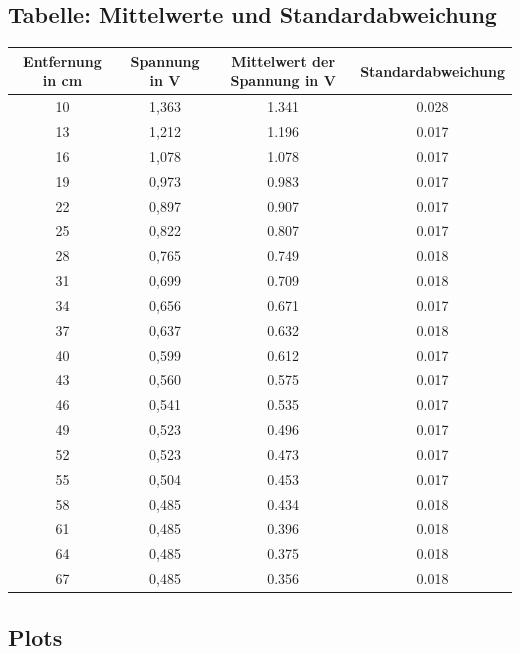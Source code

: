 \subsection{Tabelle: Mittelwerte und Standardabweichung}
\label{chap: Tabllen_Auswertung}
\begin{center}

\begin{tabular}{|c|c|c|c|}
\hline 
Entfernung in cm & Spannung in V & Mittelwert der Spannung in V & Standardabweichung  \\ 
\hline 
10 & 1,363 & 1.341 & 0.028 \\ 
\hline 
13 & 1,212 & 1.196 & 0.017 \\ 
\hline 
16 & 1,078 & 1.078 & 0.017 \\ 
\hline 
19 & 0,973 & 0.983 & 0.017 \\ 

\hline 
22 & 0,897 & 0.907 & 0.017 \\ 
\hline 
25 & 0,822 & 0.807 & 0.017 \\ 
\hline 
28 & 0,765 & 0.749 & 0.018 \\ 
\hline 
31 & 0,699 & 0.709 & 0.018 \\ 
\hline 
34 & 0,656 & 0.671 & 0.017 \\ 
\hline 

37 & 0,637 & 0.632 & 0.018 \\ 
\hline 
40 & 0,599 & 0.612 & 0.017 \\ 
\hline 
43 & 0,560 & 0.575 & 0.017 \\ 
\hline 
46 & 0,541 & 0.535 & 0.017 \\ 

\hline 
49 & 0,523 & 0.496 & 0.017 \\ 
\hline 
52 & 0,523 & 0.473 & 0.017 \\ 
\hline 
55 & 0,504 & 0.453 & 0.017 \\ 
\hline 
58 & 0,485 & 0.434 & 0.018 \\ 

\hline 
61 & 0,485 & 0.396 & 0.018 \\ 
\hline 
64 & 0,485 & 0.375 & 0.018 \\ 
\hline 
67 & 0,485 & 0.356 & 0.018 \\ 
\hline 
\end{tabular} 
\label{Tabelle: Mittelwerte und Standardabweichung}
\end{center}

\pagebreak
\subsection{Plots}
\label{Graphik: Plots vom Mittelwert und Standardabweichung}

